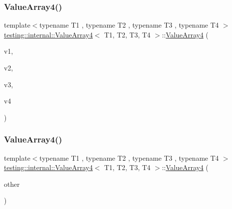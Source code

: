 \subsubsection{\texorpdfstring{ValueArray4()}{ValueArray4()}\hspace{0.1cm}{\footnotesize\ttfamily [1/2]}}
{\footnotesize\ttfamily template$<$typename T1 , typename T2 , typename T3 , typename T4 $>$ \\
\mbox{\hyperlink{classtesting_1_1internal_1_1ValueArray4}{testing\+::internal\+::\+Value\+Array4}}$<$ T1, T2, T3, T4 $>$\+::\mbox{\hyperlink{classtesting_1_1internal_1_1ValueArray4}{Value\+Array4}} (\begin{DoxyParamCaption}\item[{T1}]{v1,  }\item[{T2}]{v2,  }\item[{T3}]{v3,  }\item[{T4}]{v4 }\end{DoxyParamCaption})\hspace{0.3cm}{\ttfamily [inline]}}

\mbox{\label{classtesting_1_1internal_1_1ValueArray4_a3703e95dc214c47d705cf68fdf2e262b}} 
\subsubsection{\texorpdfstring{ValueArray4()}{ValueArray4()}\hspace{0.1cm}{\footnotesize\ttfamily [2/2]}}
{\footnotesize\ttfamily template$<$typename T1 , typename T2 , typename T3 , typename T4 $>$ \\
\mbox{\hyperlink{classtesting_1_1internal_1_1ValueArray4}{testing\+::internal\+::\+Value\+Array4}}$<$ T1, T2, T3, T4 $>$\+::\mbox{\hyperlink{classtesting_1_1internal_1_1ValueArray4}{Value\+Array4}} (\begin{DoxyParamCaption}\item[{const \mbox{\hyperlink{classtesting_1_1internal_1_1ValueArray4}{Value\+Array4}}$<$ T1, T2, T3, T4 $>$ \&}]{other }\end{DoxyParamCaption})\hspace{0.3cm}{\ttfamily [inline]}}



